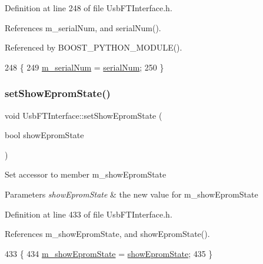 Definition at line 248 of file Usb\+F\+T\+Interface.\+h.



References m\+\_\+serial\+Num, and serial\+Num().



Referenced by B\+O\+O\+S\+T\+\_\+\+P\+Y\+T\+H\+O\+N\+\_\+\+M\+O\+D\+U\+L\+E().


\begin{DoxyCode}
248                                           \{
249     \hyperlink{classUsbFTInterface_a031610ca38939734ec7431d80f5f299f}{m\_serialNum} = \hyperlink{classUsbFTInterface_ab4a2aa9664e903c57ae396faf643e7a3}{serialNum};
250   \}
\end{DoxyCode}
\mbox{\label{classUsbFTInterface_aff0c9289dfd34e05e472f2f115f78a01}} 
\subsubsection{\texorpdfstring{set\+Show\+Eprom\+State()}{setShowEpromState()}}
{\footnotesize\ttfamily void Usb\+F\+T\+Interface\+::set\+Show\+Eprom\+State (\begin{DoxyParamCaption}\item[{bool}]{show\+Eprom\+State }\end{DoxyParamCaption})\hspace{0.3cm}{\ttfamily [inline]}}

Set accessor to member m\+\_\+show\+Eprom\+State 
\begin{DoxyParams}{Parameters}
{\em show\+Eprom\+State} & the new value for m\+\_\+show\+Eprom\+State \\
\hline
\end{DoxyParams}


Definition at line 433 of file Usb\+F\+T\+Interface.\+h.



References m\+\_\+show\+Eprom\+State, and show\+Eprom\+State().


\begin{DoxyCode}
433                                                \{
434     \hyperlink{classUsbFTInterface_aa5c215777af41de94a2b371c59c88c7c}{m\_showEpromState} = \hyperlink{classUsbFTInterface_a6e9b97244aaac289792fbef24daad33e}{showEpromState};
435   \}
\end{DoxyCode}
\mbox{\label{classUsbFTInterface_a62d90f80a81d1decd66f9b9f10cb8dc6}} 
